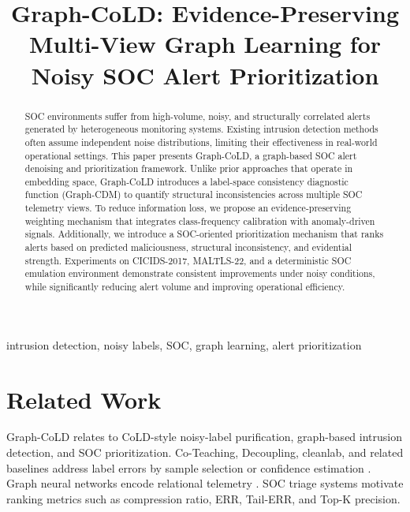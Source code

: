 \documentclass[conference]{IEEEtran}
\begin{document}
\title{Graph-CoLD: Evidence-Preserving Multi-View Graph Learning for Noisy SOC Alert Prioritization}
\author{}
\maketitle

\begin{abstract}
SOC environments suffer from high-volume, noisy, and structurally correlated alerts generated by heterogeneous monitoring systems. Existing intrusion detection methods often assume independent noise distributions, limiting their effectiveness in real-world operational settings.
This paper presents Graph-CoLD, a graph-based SOC alert denoising and prioritization framework. Unlike prior approaches that operate in embedding space, Graph-CoLD introduces a label-space consistency diagnostic function (Graph-CDM) to quantify structural inconsistencies across multiple SOC telemetry views.
To reduce information loss, we propose an evidence-preserving weighting mechanism that integrates class-frequency calibration with anomaly-driven signals. Additionally, we introduce a SOC-oriented prioritization mechanism that ranks alerts based on predicted maliciousness, structural inconsistency, and evidential strength.
Experiments on CICIDS-2017, MALTLS-22, and a deterministic SOC emulation environment demonstrate consistent improvements under noisy conditions, while significantly reducing alert volume and improving operational efficiency.
\end{abstract}

\begin{IEEEkeywords}
intrusion detection, noisy labels, SOC, graph learning, alert prioritization
\end{IEEEkeywords}



\section{Related Work}
Graph-CoLD relates to CoLD-style noisy-label purification, graph-based intrusion detection, and SOC prioritization. Co-Teaching, Decoupling, cleanlab, and related baselines address label errors by sample selection or confidence estimation \cite{han2018coteaching,malach2017decoupling,northcutt2021confident}. Graph neural networks encode relational telemetry \cite{velickovic2018gat,hamilton2017graphsage}. SOC triage systems motivate ranking metrics such as compression ratio, ERR, Tail-ERR, and Top-K precision.
\end{document}
